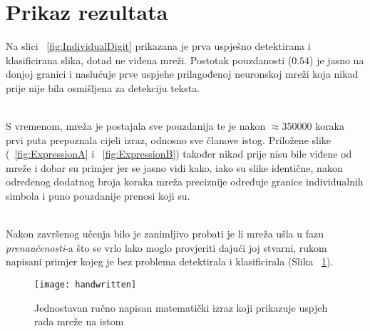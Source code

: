 \section{Prikaz rezultata}
Na slici ~\ref{fig:IndividualDigit} prikazana je prva uspješno detektirana i klasificirana slika, dotad ne viđena mreži.
Postotak pouzdanosti ($0.54$) je jasno na donjoj granici i naslućuje prve uspjehe prilagođenoj neuronskoj mreži koja nikad prije nije bila osmišljena za detekciju teksta.
\begin{figure}
	\qquad
\end{figure} \\
S vremenom, mreža je postajala sve pouzdanija te je nakon $\approx 350000$ koraka prvi puta prepoznala cijeli izraz, odnosno sve članove istog.
Priložene slike (~\ref{fig:ExpressionA} i ~\ref{fig:ExpressionB}) također nikad prije nisu bile viđene od mreže i dobar su primjer jer se jasno vidi kako, iako su slike identične, nakon određenog dodatnog broja koraka mreža preciznije određuje granice individualnih simbola i puno pouzdanije prenosi koji su. \\
\begin{figure}
	\qquad
\end{figure} \\
Nakon završenog učenja bilo je zanimljivo probati je li mreža ušla u fazu \emph{prenaučenosti}-a što se vrlo lako moglo provjeriti dajući joj stvarni, rukom napisani primjer kojeg je bez problema detektirala i klasificirala (Slika ~\ref{fig:Handwritten}).
\begin{figure}[h!]
	\texttt{[image: handwritten]}
	\caption{Jednostavan ručno napisan matematički izraz koji prikazuje uspjeh rada mreže na istom}
	\label{fig:Handwritten}
\end{figure}
